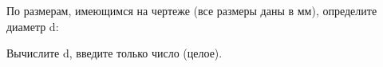 
По размерам, имеющимся на чертеже (все размеры даны в мм), определите диаметр d:


Вычислите d, введите только число (целое).